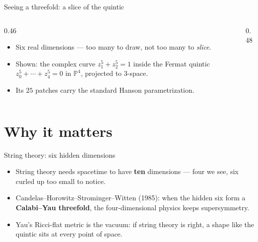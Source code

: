 \documentclass[aspectratio=169]{beamer}
\begin{document}
\begin{frame}{Seeing a threefold: a slice of the quintic}
  \begin{columns}[c]
    \begin{column}{0.46\textwidth}
      \begin{itemize}
        \item Six real dimensions — too many to draw, not too many to
              \emph{slice}.
        \item Shown: the complex curve $z_1^5 + z_2^5 = 1$ inside the Fermat
              quintic $z_0^5 + \cdots + z_4^5 = 0$ in $\mathbb{P}^4$,
              projected to $3$-space.
        \item Its $25$ patches carry the standard Hanson parametrization.
      \end{itemize}
    \end{column}
    \begin{column}{0.48\textwidth}
    \end{column}
  \end{columns}
\end{frame}

\section{Why it matters}

\begin{frame}{String theory: six hidden dimensions}
  \begin{itemize}
    \item String theory needs spacetime to have \textbf{ten} dimensions —
          four we see, six curled up too small to notice.
    \item Candelas–Horowitz–Strominger–Witten (1985): when the hidden six
          form a \textbf{Calabi–Yau threefold}, the four-dimensional physics
          keeps supersymmetry.
    \item Yau's Ricci-flat metric is the vacuum: if string theory is right,
          a shape like the quintic sits at every point of space.
  \end{itemize}
\end{frame}
\end{document}
